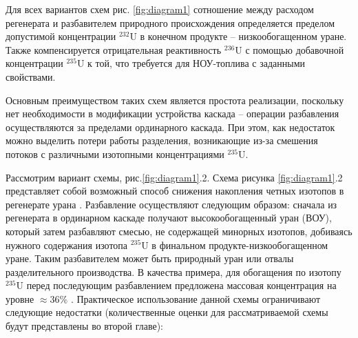 Для всех вариантов схем рис. \ref{fig:diagram1} сотношение между расходом регенерата и разбавителем природного происхождения определяется пределом допустимой концентрации $^{232}$U в конечном продукте -- низкообогащенном уране. Также компенсируется отрицательная реактивность $^{236}$U с помощью добавочной концентрации $^{235}$U к той, что требуется для НОУ-топлива с заданными свойствами.

Основным преимуществом таких схем является простота реализации, поскольку нет необходимости в модификации устройства каскада -- операции разбавления осуществляются за пределами  ординарного каскада.
При этом, как недостаток можно выделить потери работы разделения, возникающие из-за смешения потоков с различными изотопными концентрациями $^{235}$U.

Рассмотрим вариант схемы, рис.\ref{fig:diagram1}.2. Схема рисунка \ref{fig:diagram1}.2 представляет собой возможный способ снижения накопления четных изотопов в регенерате урана \cite{SposobIzotopnogoVosstanovleniyaa}. Разбавление осуществляют следующим образом: сначала из регенерата в ординарном каскаде получают высокообогащенный уран (ВОУ), который затем разбавляют смесью, не содержащей минорных изотопов, добиваясь нужного содержания изотопа $^{235}$U в финальном продукте-низкообогащенном уране. Таким разбавителем может быть природный уран или отвалы разделительного производства. В качества примера, для обогащения по изотопу $^{235}$U перед последующим разбавлением предложена массовая концентрация на уровне $\approx$36\% \cite{SposobIzotopnogoVosstanovleniyaa}. Практическое использование данной схемы ограничивают следующие недостатки (количественные оценки для рассматриваемой схемы будут представлены во второй главе): 
